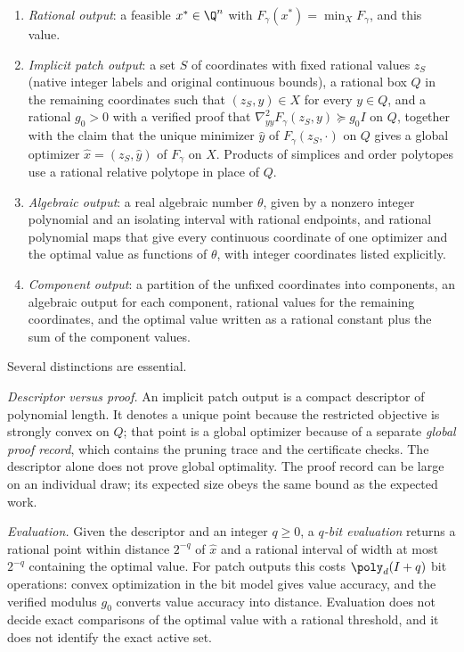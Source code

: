 \begin{definition}\label{def:model:outputs}
\leavevmode
\begin{enumerate}[label=(\alph*)]
\item\label{it:model:rational} \emph{Rational output}: a feasible
$x^*\in\Q^n$ with $F_\gamma(x^*)=\min_XF_\gamma$, and this value.
\item\label{it:model:implicit} \emph{Implicit patch output}: a set $S$ of
coordinates with fixed rational values $z_S$ (native integer labels and
original continuous bounds), a rational box $Q$ in the remaining
coordinates such that $(z_S,y)\in X$ for every $y\in Q$, and a rational
$g_0>0$ with a verified proof that
$\nabla^2_{yy}F_\gamma(z_S,y)\succeq g_0I$ on $Q$, together with the claim
that the unique minimizer $\hat y$ of $F_\gamma(z_S,\cdot)$ on $Q$ gives a
global optimizer $\hat x=(z_S,\hat y)$ of $F_\gamma$ on $X$. Products of
simplices and order polytopes use a rational relative polytope in place of
$Q$.
\item\label{it:model:algebraic} \emph{Algebraic output}: a real algebraic
number $\theta$, given by a nonzero integer polynomial and an isolating
interval with rational endpoints, and rational polynomial maps that give
every continuous coordinate of one optimizer and the optimal value as
functions of $\theta$, with integer coordinates listed explicitly.
\item\label{it:model:component} \emph{Component output}: a partition of the
unfixed coordinates into components, an algebraic output for each
component, rational values for the remaining coordinates, and the optimal
value written as a rational constant plus the sum of the component values.
\end{enumerate}
\end{definition}

Several distinctions are essential.

\emph{Descriptor versus proof.} An implicit patch output is a compact
descriptor of polynomial length. It denotes a unique point because the
restricted objective is strongly convex on $Q$; that point is a global
optimizer because of a separate \emph{global proof record}, which contains
the pruning trace and the certificate checks. The descriptor alone does not
prove global optimality. The proof record can be large on an individual
draw; its expected size obeys the same bound as the expected work.

\emph{Evaluation.} Given the descriptor and an integer $q\ge0$, a
\emph{$q$-bit evaluation} returns a rational point within distance $2^{-q}$
of $\hat x$ and a rational interval of width at most $2^{-q}$ containing the
optimal value. For patch outputs this costs $\poly_d(I+q)$ bit operations:
convex optimization in the bit model gives value accuracy, and the verified
modulus $g_0$ converts value accuracy into distance. Evaluation does not
decide exact comparisons of the optimal value with a rational threshold,
and it does not identify the exact active set.

